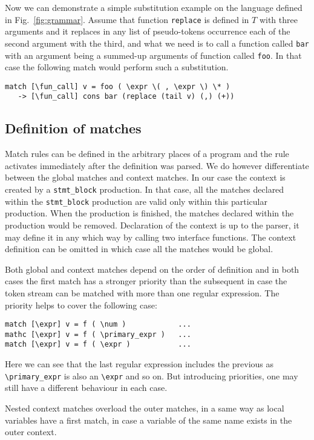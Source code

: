 Now we can demonstrate a simple substitution example on the language
defined in Fig.~\ref{fig:grammar}.  Assume that function \verb|replace|
is defined in $T$ with three arguments and it replaces in any list 
of pseudo-tokens occurrence each of the second argument with the third, 
and what we need is to call a function called \verb|bar| with an 
argument being a summed-up arguments of function called \verb|foo|.
In that case the following match would perform such a substitution.
\begin{verbatim}
match [\fun_call] v = foo ( \expr \( , \expr \) \* )
   -> [\fun_call] cons bar (replace (tail v) (,) (+))
\end{verbatim}

\subsection{Definition of matches}
Match rules can be defined in the arbitrary places of a program
and the rule activates immediately after the definition was parsed.
We do however differentiate between the global matches and context
matches.  In our case the context is created by a \verb|stmt_block|
production.  In that case, all the matches declared within the 
\verb|stmt_block| production are valid only within this particular
production.  When the production is finished, the matches declared
within the production would be removed.  Declaration of the context
is up to the parser, it may define it in any which way by calling 
two interface functions.  The context definition can be omitted in
which case all the matches would be global.

Both global and context matches depend on the order of definition
and in both cases the first match has a stronger priority than the
subsequent in case the token stream can be matched with more than
one regular expression.  The priority helps to cover the following
case:
\begin{verbatim}
match [\expr] v = f ( \num )            ...
mathc [\expr] v = f ( \primary_expr )   ...
match [\expr] v = f ( \expr )           ...
\end{verbatim}
Here we can see that the last regular expression includes the 
previous as \verb|\primary_expr| is also an \verb|\expr| and
so on.  But introducing priorities, one may still have a different
behaviour in each case.

Nested context matches overload the outer matches, in a same
way as local variables have a first match, in case a variable
of the same name exists in the outer context.

